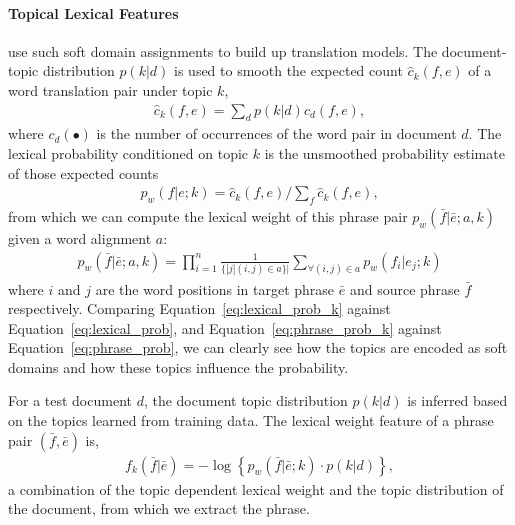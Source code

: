 
\paragraph{Topical Lexical Features}

\citet{Eidelman-12} use such soft domain assignments to build up
translation models. The document-topic distribution $p(k|d)$ is used
to smooth the expected count $\hat{c}_{k}(f,e)$ of a word translation
pair under topic $k$,
\begin{align}
\textstyle \hat{c}_{k}(f,e) = \sum_{d}{p(k|d)c_d(f,e)},
\end{align}
where $c_d(\bullet)$ is the number of occurrences of the word pair in
document $d$.  The lexical probability conditioned on topic $k$ is the
unsmoothed probability estimate of those expected counts
\begin{align}
\label{eq:lexical_prob_k}
\textstyle p_w(f|e;k) = \hat{c}_{k}(f,e) / \sum_f{\hat{c}_{k}(f,e)},
\end{align}
from which we can compute the lexical weight of this phrase pair
$p_w(\bar{f}|\bar{e};a, k)$ given a word alignment $a$\citep{koehn-03}:
\begin{align}
\label{eq:phrase_prob_k}
p_w(\bar{f} | \bar{e};a, k) = \prod^{n}_{i=1} \frac{1}{\{|j | (i, j) \in a\}|} \sum_{\forall (i,j) \in a} p_w(f_i | e_j; k)
\end{align}
where $i$ and $j$ are the word positions in target phrase $\bar{e}$
and source phrase $\bar{f}$ respectively. Comparing
Equation~\ref{eq:lexical_prob_k} against
Equation~\ref{eq:lexical_prob}, and Equation~\ref{eq:phrase_prob_k}
against Equation~\ref{eq:phrase_prob}, we can clearly see how the
topics are encoded as soft domains and how these topics influence the
probability.

For a test document $d$, the document topic distribution $p(k | d)$ is
inferred based on the topics learned from training data. The lexical
weight feature of a phrase pair $(\bar{f}, \bar{e})$ is,
\begin{align}
\textstyle f_{k}(\bar{f}|\bar{e})=-\log\left\{{p_{w}(\bar{f}|\bar{e};k)\cdot p(k|d)}\right\},
\end{align}
a combination of the topic dependent lexical weight and the topic
distribution of the document, from which we extract the phrase.

